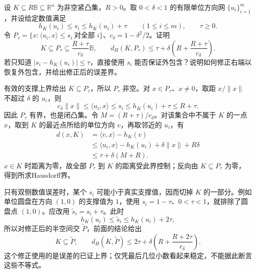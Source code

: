 \begin{exercise}\label{g1:ex:inexact-outer-support-data}
	设 \(K\subseteq R\mathbb B\subseteq\mathbb R^n\) 为非空紧凸集，\(R>0\)。取 \(0<\delta<1\) 的有限单位方向网 \(\{u_i\}_{i=1}^m\)，并设给定数值满足
	\[
		h_K(u_i)\le s_i\le h_K(u_i)+\tau\qquad(1\le i\le m),\qquad \tau\ge0.
	\]
	令 \(P_\tau=\{x:\langle u_i,x\rangle\le s_i\ \text{对全部 }i\}\)、\(c_\delta=1-\delta^2/2\)。证明
	\[
		K\subseteq P_\tau\subseteq\frac{R+\tau}{c_\delta}\mathbb B,
		\qquad
		d_H(K,P_\tau)\le
		\tau+\delta\left(R+\frac{R+\tau}{c_\delta}\right).
	\]
	若只知道 \(|s_i-h_K(u_i)|\le\tau\)，直接使用 \(s_i\) 能否保证外包含？说明如何修正右端以恢复外包含，并给出修正后的误差界。
\end{exercise}
\begin{solution}
	有效的支撑上界给出 \(K\subseteq P_\tau\)，所以 \(P_\tau\) 非空。对 \(x\in P_\tau\)、\(x\ne0\)，取距 \(x/\lVert x\rVert\) 不超过 \(\delta\) 的 \(u_i\)，则
	\[
		c_\delta\lVert x\rVert\le\langle u_i,x\rangle
		\le s_i\le h_K(u_i)+\tau\le R+\tau.
	\]
	因此 \(P_\tau\) 有界，也是闭凸集。令 \(M=(R+\tau)/c_\delta\)。对该集合中不属于 \(K\) 的一点 \(x\)，取到 \(K\) 的最近点所给的单位方向 \(v\)，再取邻近的 \(u_i\)，有
	\begin{align*}
		d(x,K)
		&=\langle v,x\rangle-h_K(v)\\
		&\le\langle u_i,x\rangle-h_K(u_i)
		+\delta\lVert x\rVert+R\delta\\
		&\le\tau+\delta(M+R).
	\end{align*}
	\(x\in K\) 时距离为零，故全部 \(P_\tau\) 到 \(K\) 的距离受此界控制；反向由 \(K\subseteq P_\tau\) 为零，得到所求Hausdorff界。

	只有双侧数值误差时，某个 \(s_i\) 可能小于真实支撑值，因而切掉 \(K\) 的一部分。例如单位圆盘在方向 \((1,0)\) 的支撑值为 \(1\)，使用 \(s_i=1-\tau\)、\(0<\tau<1\)，就排除了圆盘点 \((1,0)\)。应改用 \(\widetilde s_i=s_i+\tau\)。此时
	\[
		h_K(u_i)\le\widetilde s_i\le h_K(u_i)+2\tau,
	\]
	所以对修正后的半空间交 \(\widetilde P\)，前面的结论给出
	\[
		K\subseteq\widetilde P,\qquad
		d_H(K,\widetilde P)\le2\tau+
		\delta\left(R+\frac{R+2\tau}{c_\delta}\right).
	\]
	这个修正使用的是误差的已证上界；仅凭最后几位小数看起来稳定，不能据此断言这些不等式。
\end{solution}


